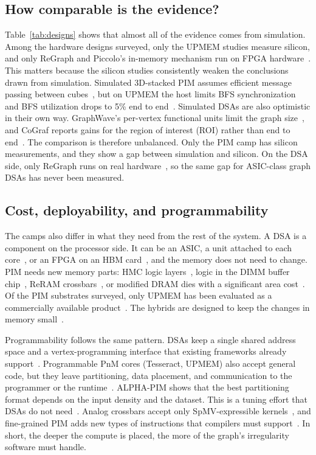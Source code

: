 \documentclass[journal,onecolumn]{IEEEtran}
\begin{document}
\subsection{How comparable is the evidence?}
Table~\ref{tab:designs} shows that almost all of the evidence comes from simulation. Among the hardware designs surveyed, only the UPMEM studies measure silicon, and only ReGraph and Piccolo's in-memory mechanism run on FPGA hardware~\cite{gomezluna2022prim,cai2024pimpam,barkhordar2025alphapim,asquini2025tc,chen2022regraph,shin2025piccolo}. This matters because the silicon studies consistently weaken the conclusions drawn from simulation. Simulated 3D-stacked PIM assumes efficient message passing between cubes~\cite{ahn2015tesseract,zhuo2019graphq}, but on UPMEM the host limits BFS synchronization~\cite{gomezluna2022prim} and BFS utilization drops to 5\% end to end~\cite{barkhordar2025alphapim}. Simulated DSAs are also optimistic in their own way. GraphWave's per-vertex functional units limit the graph size~\cite{lee2022graphwave}, and CoGraf reports gains for the region of interest (ROI) rather than end to end~\cite{yenimol2026cograf}. The comparison is therefore unbalanced. Only the PIM camp has silicon measurements, and they show a gap between simulation and silicon. On the DSA side, only ReGraph runs on real hardware~\cite{chen2022regraph}, so the same gap for ASIC-class graph DSAs has never been measured.

\subsection{Cost, deployability, and programmability}
The camps also differ in what they need from the rest of the system. A DSA is a component on the processor side. It can be an ASIC, a unit attached to each core~\cite{mukkara2018hats,zhao2022tdgraph}, or an FPGA on an HBM card~\cite{chen2022regraph}, and the memory does not need to change. PIM needs new memory parts: HMC logic layers~\cite{ahn2015tesseract}, logic in the DIMM buffer chip~\cite{talati2022ndminer}, ReRAM crossbars~\cite{song2018graphr}, or modified DRAM dies with a significant area cost~\cite{shin2025fala}. Of the PIM substrates surveyed, only UPMEM has been evaluated as a commercially available product~\cite{gomezluna2022prim}. The hybrids are designed to keep the changes in memory small~\cite{shin2025piccolo,shin2025fala}.

Programmability follows the same pattern. DSAs keep a single shared address space and a vertex-programming interface that existing frameworks already support~\cite{ham2016graphicionado}. Programmable PnM cores (Tesseract, UPMEM) also accept general code, but they leave partitioning, data placement, and communication to the programmer or the runtime~\cite{ahn2015tesseract,cai2024pimpam,barkhordar2025alphapim}. ALPHA-PIM shows that the best partitioning format depends on the input density and the dataset. This is a tuning effort that DSAs do not need~\cite{barkhordar2025alphapim}. Analog crossbars accept only SpMV-expressible kernels~\cite{song2018graphr}, and fine-grained PIM adds new types of instructions that compilers must support~\cite{yenimol2026cograf}. In short, the deeper the compute is placed, the more of the graph's irregularity software must handle.
\end{document}
